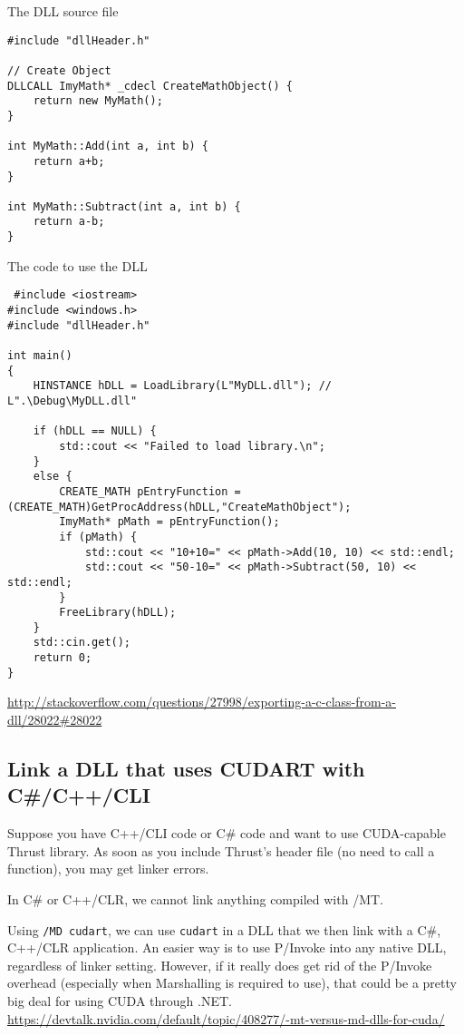 The DLL source file
\begin{verbatim}
#include "dllHeader.h"

// Create Object
DLLCALL ImyMath* _cdecl CreateMathObject() {
    return new MyMath();
}

int MyMath::Add(int a, int b) {
    return a+b;
}

int MyMath::Subtract(int a, int b) {
    return a-b;
}
\end{verbatim}

The code to use the DLL
\begin{verbatim}
 #include <iostream>
#include <windows.h>
#include "dllHeader.h"

int main()
{
    HINSTANCE hDLL = LoadLibrary(L"MyDLL.dll"); // L".\Debug\MyDLL.dll"

    if (hDLL == NULL) {
        std::cout << "Failed to load library.\n";
    }
    else {
        CREATE_MATH pEntryFunction = (CREATE_MATH)GetProcAddress(hDLL,"CreateMathObject");
        ImyMath* pMath = pEntryFunction();
        if (pMath) {
            std::cout << "10+10=" << pMath->Add(10, 10) << std::endl;
            std::cout << "50-10=" << pMath->Subtract(50, 10) << std::endl;
        }
        FreeLibrary(hDLL);
    }
    std::cin.get();
    return 0;
}
\end{verbatim}
\url{http://stackoverflow.com/questions/27998/exporting-a-c-class-from-a-dll/28022#28022}

\subsection{Link a DLL that uses CUDART with C\#/C++/CLI}

Suppose you have C++/CLI code or C\# code and want to use CUDA-capable Thrust
library. As soon as you include Thrust's header file (no need to call a
function), you may get linker errors.

In C\# or C++/CLR, we cannot link anything compiled with /MT. 

Using \verb!/MD cudart!, we can use \verb!cudart! in a DLL that we then link
with a C\#, C++/CLR application. 
An easier way is to use P/Invoke into any native DLL, regardless of linker
setting. However, if it really does get rid of the P/Invoke
overhead (especially when Marshalling is required to use), that could be a
pretty big deal for using CUDA through .NET.
\url{https://devtalk.nvidia.com/default/topic/408277/-mt-versus-md-dlls-for-cuda/}




